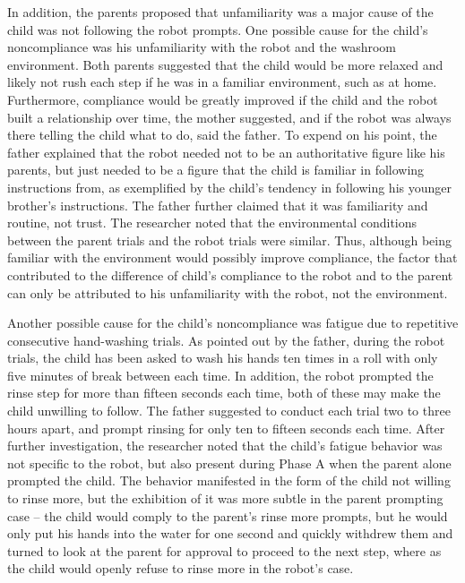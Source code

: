 In addition, the parents proposed that unfamiliarity was a major cause of the child was not following the robot prompts.  One possible cause for the child's noncompliance was his unfamiliarity with the robot and the washroom environment.  Both parents suggested that the child would be more relaxed and likely not rush each step if he was in a familiar environment, such as at home.  Furthermore, compliance would be greatly improved if the child and the robot built a relationship over time, the mother suggested, and if the robot was always there telling the child what to do, said the father.  To expend on his point, the father explained that the robot needed not to be an authoritative figure like his parents, but just needed to be a figure that the child is familiar in following instructions from, as exemplified by the child's tendency in following his younger brother's instructions.  The father further claimed that it was familiarity and routine, not trust.  The researcher noted that the environmental conditions between the parent trials and the robot trials were similar.  Thus, although being familiar with the environment would possibly improve compliance, the factor that contributed to the difference of child's compliance to the robot and to the parent can only be attributed to his unfamiliarity with the robot, not the environment.

Another possible cause for the child's noncompliance was fatigue due to repetitive consecutive hand-washing trials.  As pointed out by the father, during the robot trials, the child has been asked to wash his hands ten times in a roll with only five minutes of break between each time.  In addition, the robot prompted the rinse step for more than fifteen seconds each time, both of these may make the child unwilling to follow.  The father suggested to conduct each trial two to three hours apart, and prompt rinsing for only ten to fifteen seconds each time.  After further investigation, the researcher noted that the child's fatigue behavior was not specific to the robot, but also present during Phase A when the parent alone prompted the child.  The behavior manifested in the form of the child not willing to rinse more, but the exhibition of it was more subtle in the parent prompting case -- the child would comply to the parent's rinse more prompts, but he would only put his hands into the water for one second and quickly withdrew them and turned to look at the parent for approval to proceed to the next step, where as the child would openly refuse to rinse more in the robot's case.

